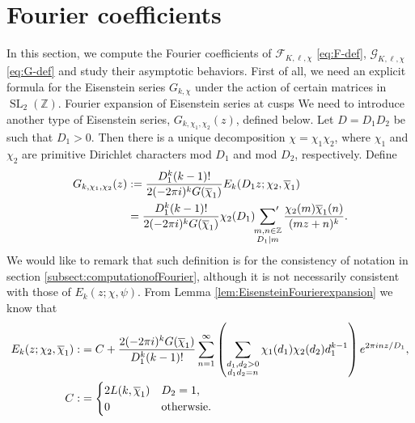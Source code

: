 \documentclass[11pt,letterpaper,reqno]{amsart}
\makeatletter
\newcommand\ques[1]{\textcolor{blue}{\textbf{Question}: #1}}
\newcommand\answ[1]{\textcolor{magenta}{\textbf{Answer}: #1}}
\numberwithin{figure}{section}
\numberwithin{table}{section}
\theoremstyle{definition}
\theoremstyle{plain}
\theoremstyle{definition}
\theoremstyle{definition}
\theoremstyle{remark}
\numberwithin{equation}{section}
\theoremstyle{remark}
\DeclareMathOperator{\Sl}{SL}
\def\subsection{\@startsection{subsection}{2}%
  \z@{.5\linespacing\@plus.7\linespacing}{.3\linespacing}%
  {\normalfont\bfseries}}
\makeatother
\begin{document}
\section{Fourier coefficients}\label{sect:Fourier}
In this section, we compute the Fourier coefficients of $\mathcal{F}_{K,\ell,\chi}$ \eqref{eq:F-def}, $\mathcal{G}_{K,\ell,\chi}$ \eqref{eq:G-def} and study their asymptotic behaviors.  First of all, we need an explicit formula for the Eisenstein series $G_{k,\chi}$ under the action of certain matrices in $\Sl_2(\mathbb{Z})$. 
\subsection{Fourier expansion of Eisenstein series at cusps}
We need to introduce another type of Eisenstein series, $G_{k,\chi_1,\chi_2}(z)$, defined below. 
 Let $D=D_1D_2$ be such that $D_1>0$. Then there is a unique decomposition $\chi=\chi_1\chi_2$, where $\chi_1$ and $\chi_2$ are primitive Dirichlet characters mod $D_1$ and mod $D_2$, respectively. Define %
\begin{align}
    G_{k,\chi_1,\chi_2}(z)&:=\frac{D_1^k(k-1)!}{2(-2\pi i)^k G(\overline{\chi}_{1})}E_{k}(D_1z;\chi_{2},\overline{\chi}_{1})
    \\&=\frac{D_1^k(k-1)!}{2(-2\pi i)^k G(\overline{\chi}_{1})}\chi_{2}(D_1)\sideset{}{'}\sum_{\substack{m,n\in\mathbb{Z}\\D_1\mid m}}\frac{\chi_{2}(m)\overline{\chi}_{1}(n)}{(mz+n)^k}.\label{eq:GkD1D2}
\end{align}
We would like to remark that such definition is for the consistency of notation in section \ref{subsect:computationofFourier}, although it is not necessarily consistent with those of $E_k(z;\chi,\psi)$.
From Lemma \ref{lem:EisensteinFourierexpansion} we know that
\begin{align}
    E_{k}(z;\chi_{2},\overline{\chi}_{1}):&=C+\frac{2(-2\pi i)^kG(\overline{\chi}_{1})}{D_1^k(k-1)!}\sum_{n=1}^{\infty}\left(\sum_{\substack{d_1,d_2>0\\ d_1d_2=n}}\chi_1(d_1)\chi_2(d_2)d_1^{k-1}\right)e^{2\pi inz/D_1},  
    \nonumber\\C:&=\begin{cases}
        2L(k,\overline{\chi}_{1})&D_2=1,\\0&{\rm otherwsie}.
    \end{cases}   \nonumber
\end{align}
\end{document}
